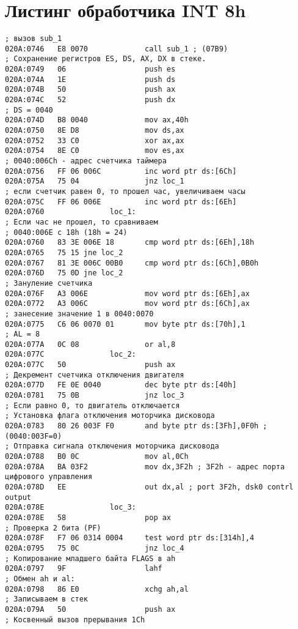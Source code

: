 \section*{Листинг обработчика INT 8h}

\begin{lstlisting}[style={asm}]
; вызов sub_1
020A:0746   E8 0070             call sub_1 ; (07B9)
; Сохранение регистров ES, DS, AX, DX в стеке.
020A:0749   06                  push es
020A:074A   1E                  push ds
020A:074B   50                  push ax
020A:074C   52                  push dx
; DS = 0040
020A:074D   B8 0040             mov ax,40h
020A:0750   8E D8               mov ds,ax
020A:0752   33 C0               xor ax,ax 
020A:0754   8E C0               mov es,ax
; 0040:006Ch - адрес счетчикa таймера
020A:0756   FF 06 006C          inc word ptr ds:[6Ch]
020A:075A   75 04               jnz loc_1
; если счетчик равен 0, то прошел час, увеличиваем часы
020A:075C   FF 06 006E          inc word ptr ds:[6Eh]
020A:0760               loc_1:
; Если час не прошел, то сравниваем
; 0040:006E c 18h (18h = 24)
020A:0760   83 3E 006E 18       cmp word ptr ds:[6Eh],18h 
020A:0765   75 15 jne loc_2 
020A:0767   81 3E 006C 00B0     cmp word ptr ds:[6Ch],0B0h
020A:076D   75 0D jne loc_2
; Зануление счетчика 
020A:076F   A3 006E             mov word ptr ds:[6Eh],ax 
020A:0772   A3 006C             mov word ptr ds:[6Ch],ax 
; занесение значение 1 в 0040:0070
020A:0775   C6 06 0070 01       mov byte ptr ds:[70h],1 
; AL = 8
020A:077A   0C 08               or al,8
020A:077C               loc_2:
020A:077C   50                  push ax
; Декремент счетчика отключения двигателя
020A:077D   FE 0E 0040          dec byte ptr ds:[40h]
020A:0781   75 0B               jnz loc_3
; Если равно 0, то двигатель отключается
; Установка флага отключения моторчика дисковода
020A:0783   80 26 003F F0       and byte ptr ds:[3Fh],0F0h ; (0040:003F=0)
; Отправка сигнала отключения моторчика дисковода
020A:0788   B0 0C               mov al,0Ch
020A:078A   BA 03F2             mov dx,3F2h ; 3F2h - адрес порта цифрового управления
020A:078D   EE                  out dx,al ; port 3F2h, dsk0 contrl output
020A:078E               loc_3:
020A:078E   58                  pop ax
; Проверка 2 бита (PF)
020A:078F   F7 06 0314 0004     test word ptr ds:[314h],4 
020A:0795   75 0C               jnz loc_4 
; Копирование младшего байта FLAGS в ah
020A:0797   9F                  lahf 
; Обмен ah и al: 
020A:0798   86 E0               xchg ah,al
; Записываем в стек 
020A:079A   50                  push ax
; Косвенный вызов прерывания 1Сh 

\end{lstlisting}
